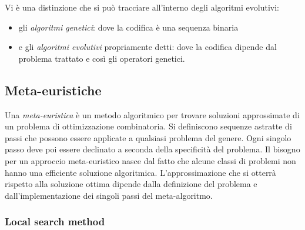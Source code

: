 \documentclass[10pt,a4paper]{article}
\begin{document}
Vi è una distinzione che si può tracciare all'interno degli algoritmi evolutivi:

\begin{itemize}
\item{gli \emph{algoritmi genetici}: dove la codifica è una sequenza binaria}
\item{e gli \emph{algoritmi evolutivi} propriamente detti: dove la codifica dipende dal problema trattato e così gli operatori genetici.}
\end{itemize}

\subsection{Meta-euristiche}

Una \emph{meta-euristica} è un metodo algoritmico per trovare soluzioni approssimate di un problema di ottimizzazione combinatoria. Si definiscono sequenze astratte di passi che possono essere applicate a qualsiasi problema del genere. Ogni singolo passo deve poi essere declinato a seconda della specificità del problema. Il bisogno per un approccio meta-euristico nasce dal fatto che alcune classi di problemi non hanno una efficiente soluzione algoritmica. L'approssimazione che si otterrà rispetto alla soluzione ottima dipende dalla definizione del problema e dall'implementazione dei singoli passi del meta-algoritmo.

\subsubsection{Local search method}
\end{document}
